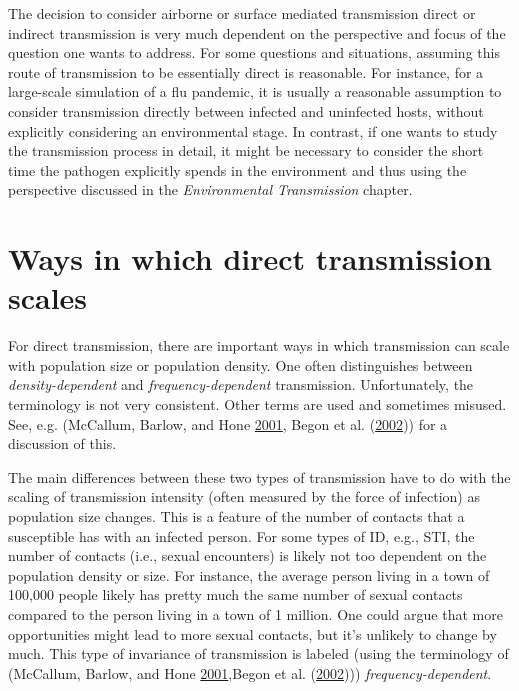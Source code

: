 \documentclass[]{book}
\theoremstyle{definition}
\theoremstyle{definition}
\theoremstyle{definition}
\theoremstyle{remark}
\begin{document}
The decision to consider airborne or surface mediated transmission
direct or indirect transmission is very much dependent on the
perspective and focus of the question one wants to address. For some
questions and situations, assuming this route of transmission to be
essentially direct is reasonable. For instance, for a large-scale
simulation of a flu pandemic, it is usually a reasonable assumption to
consider transmission directly between infected and uninfected hosts,
without explicitly considering an environmental stage. In contrast, if
one wants to study the transmission process in detail, it might be
necessary to consider the short time the pathogen explicitly spends in
the environment and thus using the perspective discussed in the
\emph{Environmental Transmission} chapter.

\section{Ways in which direct transmission
scales}\label{ways-in-which-direct-transmission-scales}

For direct transmission, there are important ways in which transmission
can scale with population size or population density. One often
distinguishes between \emph{density-dependent} and
\emph{frequency-dependent} transmission. Unfortunately, the terminology
is not very consistent. Other terms are used and sometimes misused. See,
e.g. (McCallum, Barlow, and Hone
\protect\hyperlink{ref-mccallum01}{2001}, Begon et al.
(\protect\hyperlink{ref-begon02}{2002})) for a discussion of this.

The main differences between these two types of transmission have to do
with the scaling of transmission intensity (often measured by the force
of infection) as population size changes. This is a feature of the
number of contacts that a susceptible has with an infected person. For
some types of ID, e.g., STI, the number of contacts (i.e., sexual
encounters) is likely not too dependent on the population density or
size. For instance, the average person living in a town of 100,000
people likely has pretty much the same number of sexual contacts
compared to the person living in a town of 1 million. One could argue
that more opportunities might lead to more sexual contacts, but it's
unlikely to change by much. This type of invariance of transmission is
labeled (using the terminology of (McCallum, Barlow, and Hone
\protect\hyperlink{ref-mccallum01}{2001},Begon et al.
(\protect\hyperlink{ref-begon02}{2002}))) \emph{frequency-dependent}.
\end{document}
